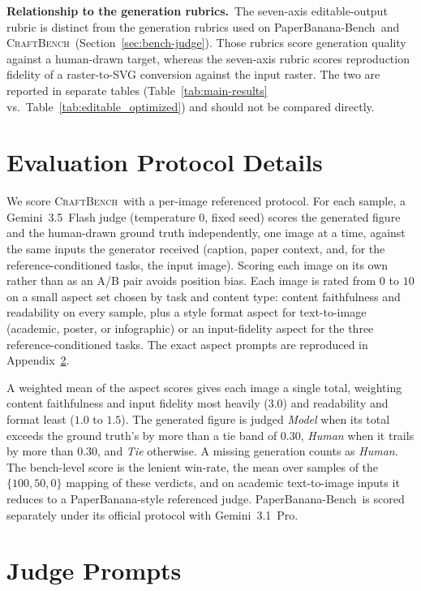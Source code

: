 \documentclass{article}
\newcommand{\CrafterBench}{\textsc{CraftBench}\xspace}
\newcommand{\PaperBananaBench}{PaperBanana-Bench\xspace}
\begin{document}
\noindent\textbf{Relationship to the generation rubrics.}\
The seven-axis editable-output rubric is distinct from the generation rubrics used on \PaperBananaBench\ and \CrafterBench\ (Section~\ref{sec:bench-judge}). Those rubrics score generation quality against a human-drawn target, whereas the seven-axis rubric scores reproduction fidelity of a raster-to-SVG conversion against the input raster. The two are reported in separate tables (Table~\ref{tab:main-results} vs.\ Table~\ref{tab:editable_optimized}) and should not be compared directly.

\section{Evaluation Protocol Details}
\label{app:eval-protocol}

We score \CrafterBench\ with a per-image referenced protocol. For each sample, a Gemini~3.5~Flash judge (temperature $0$, fixed seed) scores the generated figure and the human-drawn ground truth independently, one image at a time, against the same inputs the generator received (caption, paper context, and, for the reference-conditioned tasks, the input image). Scoring each image on its own rather than as an A/B pair avoids position bias. Each image is rated from $0$ to $10$ on a small aspect set chosen by task and content type: content faithfulness and readability on every sample, plus a style format aspect for text-to-image (academic, poster, or infographic) or an input-fidelity aspect for the three reference-conditioned tasks. The exact aspect prompts are reproduced in Appendix~\ref{app:judge-prompts}.

A weighted mean of the aspect scores gives each image a single total, weighting content faithfulness and input fidelity most heavily ($3.0$) and readability and format least ($1.0$ to $1.5$). The generated figure is judged \textit{Model} when its total exceeds the ground truth's by more than a tie band of $0.30$, \textit{Human} when it trails by more than $0.30$, and \textit{Tie} otherwise. A missing generation counts as \textit{Human}. The bench-level score is the lenient win-rate, the mean over samples of the $\{100, 50, 0\}$ mapping of these verdicts, and on academic text-to-image inputs it reduces to a PaperBanana-style referenced judge. \PaperBananaBench\ is scored separately under its official protocol with Gemini~3.1~Pro.

\section{Judge Prompts}
\label{app:judge-prompts}
\end{document}
